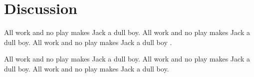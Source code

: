 
%
%

%
%

\section{Discussion}
\label{sec:discussion}

All work and no play makes Jack a dull boy.
All work and no play makes Jack a dull boy.
All work and no play makes Jack a dull boy
\cite{einstein-electrodynamics}.

All work and no play makes Jack a dull boy.
All work and no play makes Jack a dull boy.
All work and no play makes Jack a dull boy.





